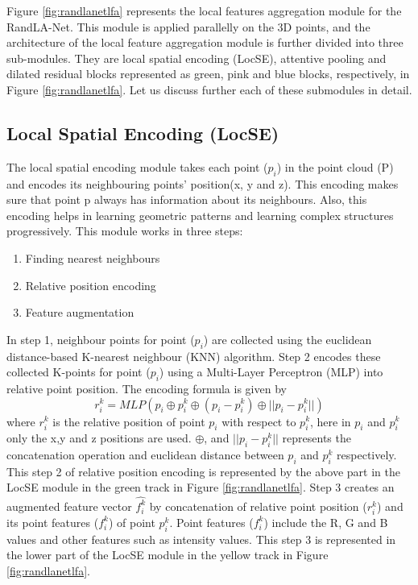Figure \ref{fig:randlanetlfa} represents the local features aggregation module for the RandLA-Net.
This module is applied parallelly on the 3D points, and the architecture of the local feature aggregation module is further divided into three sub-modules.
They are local spatial encoding (LocSE), attentive pooling and dilated residual blocks represented as green, pink and blue blocks, respectively, in Figure \ref{fig:randlanetlfa}.
Let us discuss further each of these submodules in detail.

\subsection{Local Spatial Encoding (LocSE)}
The local spatial encoding module takes each point ($p_i$) in the point cloud (P) and encodes its neighbouring points' position(x, y and z).
This encoding makes sure that point p always has information about its neighbours.
Also, this encoding helps in learning geometric patterns and learning complex structures progressively.
This module works in three steps:
\begin{enumerate}
    \item Finding nearest neighbours
    \item Relative position encoding
    \item Feature augmentation
\end{enumerate}

In step 1, neighbour points for point ($p_i$) are collected using the euclidean distance-based K-nearest neighbour (KNN) algorithm.
Step 2 encodes these collected K-points for point ($p_i$) using a Multi-Layer Perceptron (MLP) into relative point position. The encoding formula is given by
$$
r_i^k = MLP(p_i \oplus p_i^k \oplus (p_i - p_i^k) \oplus ||p_i-p_i^k||)
$$
where $r_i^k$ is the relative position of point $p_i$ with respect to $p_i^k$, here in $p_i$ and $p_i^k$ only the x,y and z positions are used.
$\oplus$, and $||p_i-p_i^k||$ represents the concatenation operation and euclidean distance between $p_i$ and $p_i^k$ respectively.
This step 2 of relative position encoding is represented by the above part in the LocSE module in the green track in Figure \ref{fig:randlanetlfa}.
Step 3 creates an augmented feature vector $\hat{f_i^k}$ by concatenation of relative point position ($r_i^k$) and its point features ($f_i^k$) of point $p_i^k$.
Point features ($f_i^k$) include the R, G and B values and other features such as intensity values.
This step 3 is represented in the lower part of the LocSE module in the yellow track in Figure \ref{fig:randlanetlfa}.
